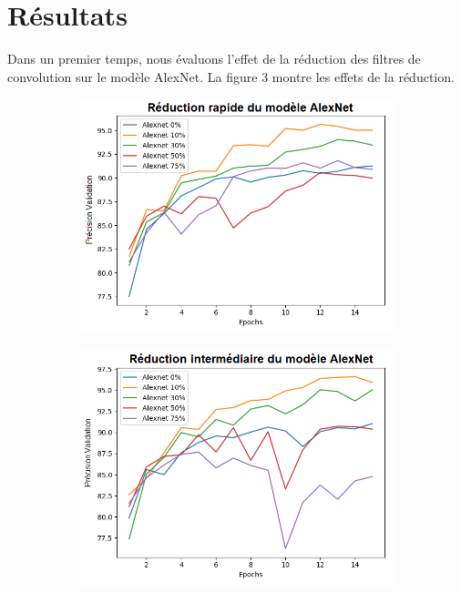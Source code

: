 \documentclass[12pt]{article}
\begin{document}
\section*{Résultats}
Dans un premier temps, nous évaluons l’effet de la réduction des filtres de convolution sur le modèle AlexNet. La figure 3 montre les effets de la réduction.
\begin{figure}[H]
	\centering
	\begin{subfigure}[b]{0.33\textwidth}            
		\includegraphics[width=\textwidth]{fig/prune_ratio_rough_fr}
		\label{fig:pruneratiorough}
	\end{subfigure}%
	\begin{subfigure}[b]{0.33\textwidth}
		\centering
		\includegraphics[width=\textwidth]{fig/prune_ratio_medium_fr}

\end{subfigure}
\end{figure}
\end{document}
